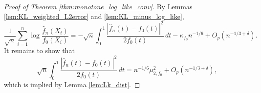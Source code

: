 \documentclass[12pt,letterpaper, twoside, openany]{article}
\theoremstyle{plain}
\begin{document}
\begin{proof}[Proof of Theorem \ref{thm:monotone_log_like_conv}]
By Lemmas \ref{lem:KL_weighted_L2error} and \ref{lem:KL_minus_log_like}, 
\begin{equation*}
	\frac{1}{\sqrt{n}} \sum^n_{i=1} \log \frac{\hat{f}_{n}(X_i)}{f_0(X_i)} = - \sqrt{n}\int_0^1 \frac{|\hat{f}_n(t) - f_0(t)|^2}{2f_0(t)} \,dt  -  \kappa_{f_0}n^{-1/6} +  O_p(n^{-1/3 + \delta}).
\end{equation*}
It remains to show that 
\begin{equation*}
	\sqrt{n}\int_0^1 \frac{|\hat{f}_n(t) - f_0(t)|^2}{2f_0(t)}\,dt 
	= n^{-1/6}\mu_{2, f_0}^2 + O_p(n^{-1/3 + \delta}),
\end{equation*}
which is implied by Lemma \ref{lem:Lk_dist}.

\end{proof}
\end{document}
